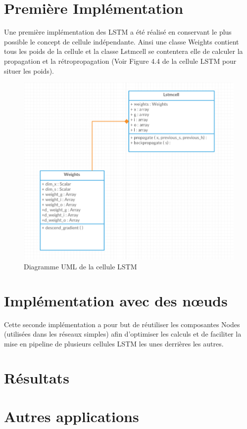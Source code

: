 \documentclass{report}
\theoremstyle{plain}
\theoremstyle{definition}
\theoremstyle{remark}
\begin{document}
\section{Première Implémentation}

Une première implémentation des LSTM a été réalisé en conservant le plus possible le concept de cellule indépendante. Ainsi une classe Weights contient tous les poids de la cellule et la classe Lstmcell se contentera elle de calculer la propagation et la rétropropagation (Voir Figure 4.4 de la cellule LSTM pour situer les poids).

\begin{figure}[h!]
\begin{center}
\includegraphics[scale=0.8]{images/UML_LSTM_Implementation_1.png}
\caption{Diagramme UML de la cellule LSTM}
\label{cellule LSTM UML 1}
\end{center}
\end{figure}

\section{Implémentation avec des nœuds}

Cette seconde implémentation a pour but de réutiliser les composantes Nodes (utilisées dans les réseaux simples) afin d'optimiser les calculs et de faciliter la mise en pipeline de plusieurs cellules LSTM les unes derrières les autres.

\section{Résultats}
\section{Autres applications}




\end{document}
